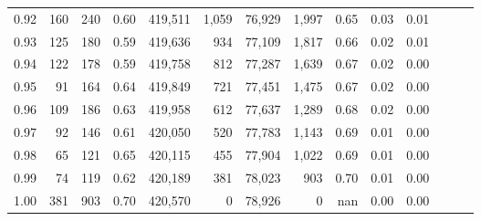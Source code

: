 \begin{tabular}{rrrrrrrrrrrrrr}
0.92 &    160 &    240 &  0.60 &  419,511 &    1,059 &  76,929 &   1,997 &  0.65 &  0.03 &      0.01 \\
0.93 &    125 &    180 &  0.59 &  419,636 &      934 &  77,109 &   1,817 &  0.66 &  0.02 &      0.01 \\
0.94 &    122 &    178 &  0.59 &  419,758 &      812 &  77,287 &   1,639 &  0.67 &  0.02 &      0.00 \\
0.95 &     91 &    164 &  0.64 &  419,849 &      721 &  77,451 &   1,475 &  0.67 &  0.02 &      0.00 \\
0.96 &    109 &    186 &  0.63 &  419,958 &      612 &  77,637 &   1,289 &  0.68 &  0.02 &      0.00 \\
0.97 &     92 &    146 &  0.61 &  420,050 &      520 &  77,783 &   1,143 &  0.69 &  0.01 &      0.00 \\
0.98 &     65 &    121 &  0.65 &  420,115 &      455 &  77,904 &   1,022 &  0.69 &  0.01 &      0.00 \\
0.99 &     74 &    119 &  0.62 &  420,189 &      381 &  78,023 &     903 &  0.70 &  0.01 &      0.00 \\
1.00 &    381 &    903 &  0.70 &  420,570 &        0 &  78,926 &       0 &   nan &  0.00 &      0.00 \\
\bottomrule
\end{tabular}
